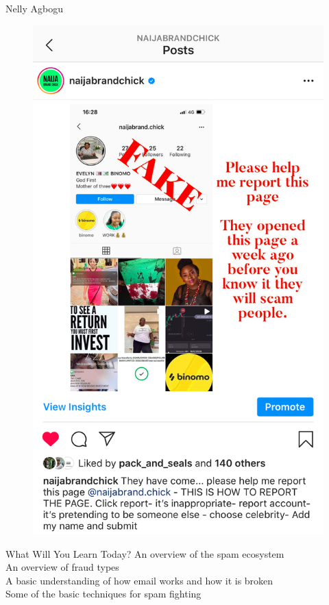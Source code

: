 \documentclass[nobackground,dvipsnames,table]{beamer}
\begin{document}
\begin{frame}{Nelly Agbogu}
    \begin{figure}
        \centering
        \includegraphics[height=0.85\textheight]{nelly-agbogu}
    \end{figure}
\end{frame}

\begin{frame}{What Will You Learn Today?}
    An overview of the spam ecosystem\\
    An overview of fraud types\\
    A basic understanding of how email works and how it is broken\\
    Some of the basic techniques for spam fighting
\end{frame}
\end{document}
